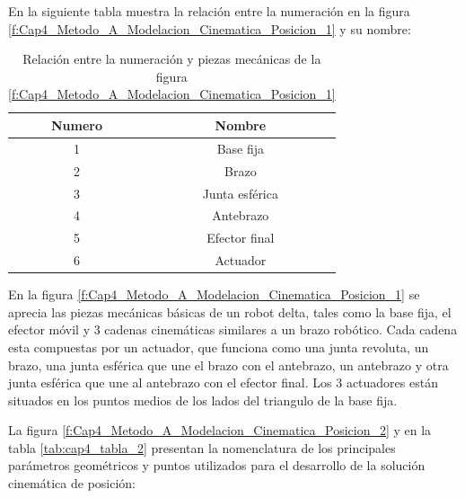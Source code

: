          En la siguiente tabla muestra la relación entre la numeración en la figura \ref{f:Cap4_Metodo_A_Modelacion_Cinematica_Posicion_1} y su nombre:
        
        \begin{table}[h]
            \centering
            \begin{tabular}{c c}
            \hline
                \textbf{Numero}& \textbf{Nombre} \\ 
            \hline             \hline
             1 & Base fija \\
            \hline
             2 & Brazo \\
            \hline
             3 & Junta esférica \\
            \hline
             4 & Antebrazo\\
            \hline
             5 & Efector final \\
             \hline
             6 & Actuador  \\
             \hline
            \end{tabular}
           \caption{Relación entre la numeración y piezas mecánicas de la figura  \ref{f:Cap4_Metodo_A_Modelacion_Cinematica_Posicion_1}}
           \label{tab:cap4_tabla_1}
        \end{table}

        \newpage
 
         En la figura \ref{f:Cap4_Metodo_A_Modelacion_Cinematica_Posicion_1}  se aprecia las piezas mecánicas básicas de un robot delta, tales como la  base fija, el efector móvil y 3 cadenas cinemáticas similares a un brazo robótico. Cada cadena esta compuestas por un actuador, que funciona como una junta revoluta, un brazo, una junta esférica que une el brazo con el antebrazo, un antebrazo y otra junta esférica que une al antebrazo con el efector final. Los 3 actuadores están situados en los puntos medios de los lados del triangulo de la base fija.
         
        La figura \ref{f:Cap4_Metodo_A_Modelacion_Cinematica_Posicion_2} y en la tabla \ref{tab:cap4_tabla_2} presentan la nomenclatura de los principales parámetros geométricos y puntos utilizados para el desarrollo de la solución cinemática de posición:
        
